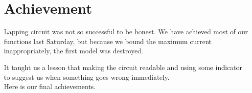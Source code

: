 \documentclass[12pt]{article}
\begin{document}
\section{Achievement}   
Lapping circuit was not so successful to be honest. We have achieved most of our functions last Saturday, but because we bound the maximum current inappropriately, the first model was destroyed. \\
\begin{center}
\end{center}
It taught us a lesson that making the circuit readable and using some indicator to suggest us when something goes wrong immediately. \\
Here is our final achievements.\\
\end{document}
